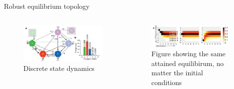 \documentclass[aspectratio=169, 10pt]{beamer}
\begin{document}
\begin{frame}[fragile]{Robust equilibrium topology}
  \begin{columns}[onlytextwidth]
    \begin{figure}
      \centering
      \includegraphics[width=\textwidth]{figures/fig2a.png}
      \caption{Discrete state dynamics}
    \end{figure}
    \begin{figure}
      \centering
      \includegraphics[width=\textwidth]{figures/fig2c.png}
      \caption{Figure showing the same attained equilibirum, no matter the initial conditions}
    \end{figure}
  \end{columns}  
\end{frame}
\end{document}
